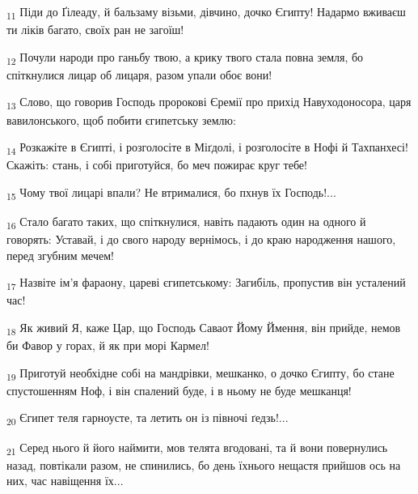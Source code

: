 \begin{tcolorbox}
\textsubscript{11} Піди до Ґілеаду, й бальзаму візьми, дівчино, дочко Єгипту! Надармо вживаєш ти ліків багато, своїх ран не загоїш!
\end{tcolorbox}
\begin{tcolorbox}
\textsubscript{12} Почули народи про ганьбу твою, а крику твого стала повна земля, бо спіткнулися лицар об лицаря, разом упали обоє вони!
\end{tcolorbox}
\begin{tcolorbox}
\textsubscript{13} Слово, що говорив Господь пророкові Єремії про прихід Навуходоносора, царя вавилонського, щоб побити єгипетську землю:
\end{tcolorbox}
\begin{tcolorbox}
\textsubscript{14} Розкажіте в Єгипті, і розголосіте в Міґдолі, і розголосіте в Нофі й Тахпанхесі! Скажіть: стань, і собі приготуйся, бо меч пожирає круг тебе!
\end{tcolorbox}
\begin{tcolorbox}
\textsubscript{15} Чому твої лицарі впали? Не втрималися, бо пхнув їх Господь!...
\end{tcolorbox}
\begin{tcolorbox}
\textsubscript{16} Стало багато таких, що спіткнулися, навіть падають один на одного й говорять: Уставай, і до свого народу вернімось, і до краю народження нашого, перед згубним мечем!
\end{tcolorbox}
\begin{tcolorbox}
\textsubscript{17} Назвіте ім'я фараону, цареві єгипетському: Загибіль, пропустив він усталений час!
\end{tcolorbox}
\begin{tcolorbox}
\textsubscript{18} Як живий Я, каже Цар, що Господь Саваот Йому Ймення, він прийде, немов би Фавор у горах, й як при морі Кармел!
\end{tcolorbox}
\begin{tcolorbox}
\textsubscript{19} Приготуй необхідне собі на мандрівки, мешканко, о дочко Єгипту, бо стане спустошенням Ноф, і він спалений буде, і в ньому не буде мешканця!
\end{tcolorbox}
\begin{tcolorbox}
\textsubscript{20} Єгипет теля гарноусте, та летить он із півночі ґедзь!...
\end{tcolorbox}
\begin{tcolorbox}
\textsubscript{21} Серед нього й його наймити, мов телята вгодовані, та й вони повернулись назад, повтікали разом, не спинились, бо день їхнього нещастя прийшов ось на них, час навіщення їх...
\end{tcolorbox}
